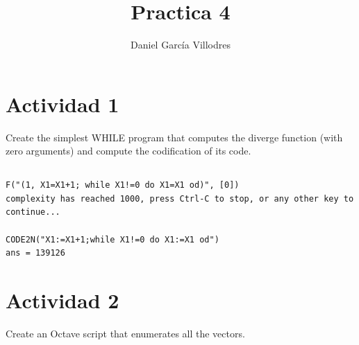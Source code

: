 \documentclass[fleqn, 10pt]{article}
\title{\textbf{Practica 4}}
\author{Daniel García Villodres}
\date{}
\begin{document}
\maketitle
\thispagestyle{empty}

\section*{Actividad 1}
Create the simplest WHILE program that computes the diverge function (with
zero arguments) and compute the codification of its code.

\subsection*{}

\begin{verbatim}
F("(1, X1=X1+1; while X1!=0 do X1=X1 od)", [0])
complexity has reached 1000, press Ctrl-C to stop, or any other key to continue...

CODE2N("X1:=X1+1;while X1!=0 do X1:=X1 od")
ans = 139126
\end{verbatim}


\section*{Actividad 2}
Create an Octave script that enumerates all the vectors.
\end{document}
